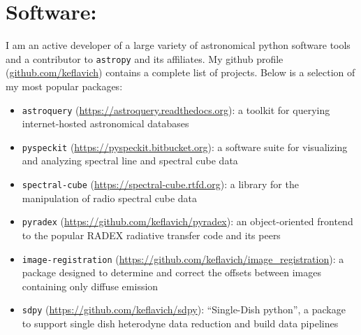 \section*{Software:}
\vspace{-10pt}
I am an active developer of a large variety of astronomical python software
tools and a contributor to \texttt{astropy} and its affiliates.  My github
profile (\url{github.com/keflavich}) contains a complete list of projects.
Below is a selection of my most popular packages:
\vspace{-10pt}

\begin{itemize}
\itemsep-3pt
    \item \texttt{astroquery} (\url{https://astroquery.readthedocs.org}):
        a toolkit for querying internet-hosted astronomical databases
    \item \texttt{pyspeckit} (\url{https://pyspeckit.bitbucket.org}): a software suite
        for visualizing and analyzing spectral line and spectral cube
        data
    \item \texttt{spectral-cube} (\url{https://spectral-cube.rtfd.org}): a library for the manipulation
        of radio spectral cube data
    \item \texttt{pyradex} (\url{https://github.com/keflavich/pyradex}):
        an object-oriented frontend to the popular RADEX radiative transfer code and
        its peers
    \item \texttt{image-registration} (\url{https://github.com/keflavich/image_registration}):
        a package designed to determine and correct the offsets between images containing only
        diffuse emission
    \item \texttt{sdpy} (\url{https://github.com/keflavich/sdpy}):
        ``Single-Dish python'', a package to support single dish heterodyne data
        reduction and build data pipelines
\end{itemize}


